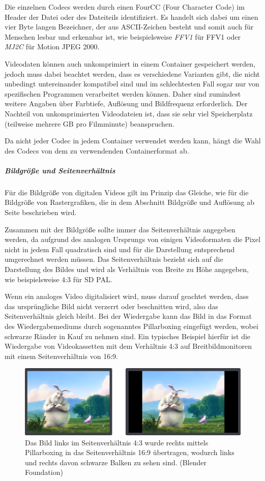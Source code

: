 Die einzelnen Codecs werden durch einen FourCC (Four Character Code) im Header der Datei oder des Dateiteils identifiziert. Es handelt sich dabei um einen vier Byte langen Bezeichner, der aus ASCII-Zeichen besteht und somit auch für Menschen lesbar und erkennbar ist, wie beispielsweise \emph{FFV1} für FFV1 oder \emph{MJ2C} für Motion JPEG 2000.

Videodaten können auch unkomprimiert in einem Container gespeichert werden, jedoch muss dabei beachtet werden, dass es verschiedene Varianten gibt, die nicht unbedingt untereinander kompatibel sind und im schlechtesten Fall sogar nur von spezifischen Programmen verarbeitet werden können. Daher sind zumindest weitere Angaben über Farbtiefe, Auflösung und Bildfrequenz erforderlich. Der Nachteil von unkomprimierten Videodateien ist, dass sie sehr viel Speicherplatz (teilweise mehrere GB pro Filmminute) beanspruchen.

Da nicht jeder Codec in jedem Container verwendet werden kann, hängt die Wahl des Codecs von dem zu verwendenden Containerformat ab.

\subparagraph{Bildgröße und Seitenverhältnis} Für die Bildgröße von digitalen Videos gilt im Prinzip das Gleiche, wie für die Bildgröße von Rastergrafiken, die in dem Abschnitt Bildgröße und Auflösung ab Seite \pageref{RG_Bildgroesse} beschrieben wird. 

Zusammen mit der Bildgröße sollte immer das Seitenverhältnis angegeben werden, da aufgrund des analogen Ursprungs von einigen Videoformaten die Pixel nicht in jedem Fall quadratisch sind und für die Darstellung entsprechend umgerechnet werden müssen. Das Seitenverhältnis bezieht sich auf die Darstellung des Bildes und wird als Verhältnis von Breite zu Höhe angegeben, wie beispielsweise 4:3 für SD PAL.

Wenn ein analoges Video digitalisiert wird, muss darauf geachtet werden, dass das ursprüngliche Bild nicht verzerrt oder beschnitten wird, also das Seitenverhältnis gleich bleibt. Bei der Wiedergabe kann das Bild in das Format des Wiedergabemediums durch sogenanntes Pillarboxing eingefügt werden, wobei schwarze Ränder in Kauf zu nehmen sind. Ein typisches Beispiel hierfür ist die Wiedergabe von Videokassetten mit dem Verhältnis 4:3 auf Breitbildmonitoren mit einem Seitenverhältnis von 16:9.

\begin{figure}[h!tb]
\centering
  \includegraphics[width=\linewidth]{bilder/video_4-3zu16-9}
\caption{Das Bild links im Seitenverhältnis 4:3 wurde rechts mittels Pillarboxing in das Seitenverhältnis 16:9 übertragen, wodurch links und rechts davon schwarze Balken zu sehen sind. (Blender Foundation)}
\end{figure}
  

